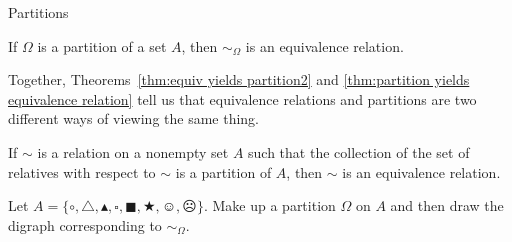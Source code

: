 \begin{section}{Partitions}
\begin{theorem}\label{thm:partition yields equivalence relation}
If $\Omega$ is a partition of a set $A$, then $\sim_{\Omega}$ is an equivalence relation.
\end{theorem}

Together, Theorems~\ref{thm:equiv yields partition2} and \ref{thm:partition yields equivalence relation} tell us that equivalence relations and partitions are two different ways of viewing the same thing.

\begin{corollary}\label{cor:partition yields equivalence relation}
If $\sim$ is a relation on a nonempty set $A$ such that the collection of the set of relatives with respect to $\sim$ is a partition of $A$, then $\sim$ is an equivalence relation.
\end{corollary}

\begin{problem}
Let $A=\{\circ, \triangle, \blacktriangle, \square, \blacksquare, \bigstar, \smiley, \frownie\}$.  Make up a partition $\Omega$ on $A$ and then draw the digraph corresponding to $\sim_{\Omega}$.
\end{problem}

\end{section}